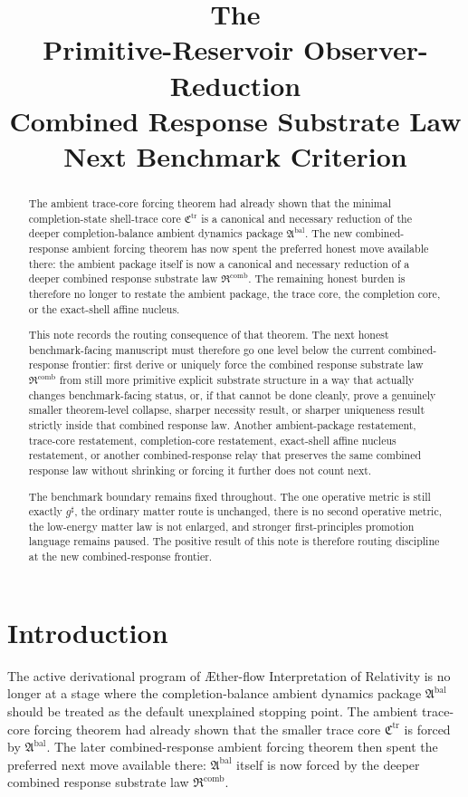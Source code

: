 \documentclass[11pt]{article}
\title{\textbf{The \TheoryName{}}\\[0.4em]
\large Primitive-Reservoir Observer-Reduction\\
\large Combined Response Substrate Law\\
\large Next Benchmark Criterion}
\author{}
\date{}
\newcommand{\Aflow}{\AE{}ther-flow}
\newcommand{\TheoryName}{\Aflow{} Interpretation of Relativity}
\newcommand{\CompletedMetric}{g^{\sharp}}
\newcommand{\TraceCore}{\mathfrak C^{\mathrm{tr}}}
\newcommand{\AmbientPackage}{\mathfrak A^{\mathrm{bal}}}
\newcommand{\CombinedLaw}{\mathfrak R^{\mathrm{comb}}}
\begin{document}
\maketitle

\begin{abstract}
The ambient trace-core forcing theorem had already shown that the minimal completion-state shell-trace core \(\TraceCore\) is a canonical and necessary reduction of the deeper completion-balance ambient dynamics package \(\AmbientPackage\). The new combined-response ambient forcing theorem has now spent the preferred honest move available there: the ambient package itself is now a canonical and necessary reduction of a deeper combined response substrate law \(\CombinedLaw\). The remaining honest burden is therefore no longer to restate the ambient package, the trace core, the completion core, or the exact-shell affine nucleus.

This note records the routing consequence of that theorem. The next honest benchmark-facing manuscript must therefore go one level below the current combined-response frontier: first derive or uniquely force the combined response substrate law \(\CombinedLaw\) from still more primitive explicit substrate structure in a way that actually changes benchmark-facing status, or, if that cannot be done cleanly, prove a genuinely smaller theorem-level collapse, sharper necessity result, or sharper uniqueness result strictly inside that combined response law. Another ambient-package restatement, trace-core restatement, completion-core restatement, exact-shell affine nucleus restatement, or another combined-response relay that preserves the same combined response law without shrinking or forcing it further does not count next.

The benchmark boundary remains fixed throughout. The one operative metric is still exactly \(\CompletedMetric\), the ordinary matter route is unchanged, there is no second operative metric, the low-energy matter law is not enlarged, and stronger first-principles promotion language remains paused. The positive result of this note is therefore routing discipline at the new combined-response frontier.
\end{abstract}

\section{Introduction}

The active derivational program of \TheoryName{} is no longer at a stage where the completion-balance ambient dynamics package \(\AmbientPackage\) should be treated as the default unexplained stopping point. The ambient trace-core forcing theorem had already shown that the smaller trace core \(\TraceCore\) is forced by \(\AmbientPackage\). The later combined-response ambient forcing theorem then spent the preferred next move available there: \(\AmbientPackage\) itself is now forced by the deeper combined response substrate law \(\CombinedLaw\).
\end{document}

